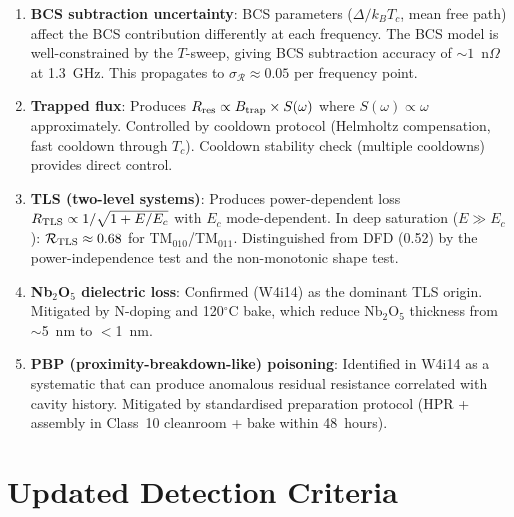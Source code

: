 \documentclass[11pt]{article}
\theoremstyle{definition}
\theoremstyle{remark}
\begin{document}
\begin{enumerate}
\item \textbf{BCS subtraction uncertainty}: BCS parameters
  ($\Delta/k_B T_c$, mean free path) affect the BCS contribution
  differently at each frequency. The BCS model is well-constrained
  by the $T$-sweep, giving BCS subtraction accuracy of $\sim 1$~n$\Omega$
  at 1.3~GHz. This propagates to $\sigma_{\mathcal{R}} \approx 0.05$
  per frequency point.

\item \textbf{Trapped flux}: Produces $R_{\rm res} \propto B_{\rm trap}
  \times S(\omega)$ where $S(\omega) \propto \omega$ approximately.
  Controlled by cooldown protocol (Helmholtz compensation, fast cooldown
  through $T_c$). Cooldown stability check (multiple cooldowns) provides
  direct control.

\item \textbf{TLS (two-level systems)}: Produces power-dependent loss
  $R_{\rm TLS} \propto 1/\sqrt{1 + E/E_c}$ with $E_c$ mode-dependent.
  In deep saturation ($E \gg E_c$): $\mathcal{R}_{\rm TLS} \approx 0.68$
  for TM$_{010}$/TM$_{011}$. Distinguished from DFD (0.52) by the
  power-independence test and the non-monotonic shape test.

\item \textbf{Nb$_2$O$_5$ dielectric loss}: Confirmed (W4i14) as the
  dominant TLS origin. Mitigated by N-doping and 120$^\circ$C bake,
  which reduce Nb$_2$O$_5$ thickness from $\sim$5~nm to $<$1~nm.

\item \textbf{PBP (proximity-breakdown-like) poisoning}: Identified
  in W4i14 as a systematic that can produce anomalous residual
  resistance correlated with cavity history. Mitigated by standardised
  preparation protocol (HPR + assembly in Class~10 cleanroom + bake
  within 48~hours).
\end{enumerate}


\part{Updated Detection Criteria}
\label{part:criteria}
\end{document}
